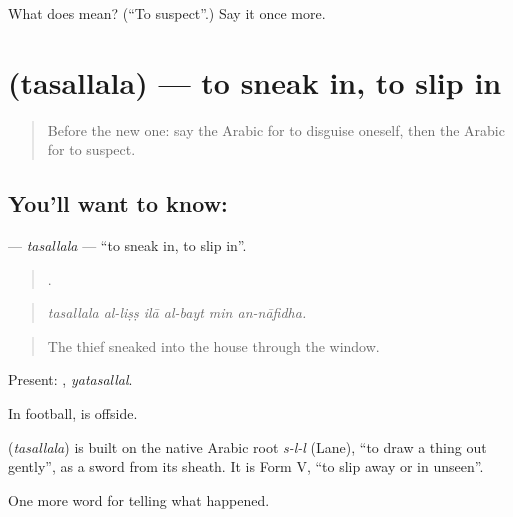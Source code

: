 \begin{tcolorbox}[breakable,colback=teal!4,colframe=teal!35!black,title={Before you move on}]
What does  mean? (\textquotedblleft{}To suspect\textquotedblright{}.) Say it once more.
\end{tcolorbox}
\section[\texorpdfstring{\ar{تسلل} (tasallala)}{تسلل (tasallala)}]{ (tasallala) — to sneak in, to slip in}

\label{lesson:AR-C346-tasallala}



\begin{quote}
Before the new one: say the Arabic for to disguise oneself, then the Arabic for to suspect.
\end{quote}

\subsection*{You'll want to know: }
\textbf{} — \emph{tasallala} — \textquotedblleft{}to sneak in, to slip in\textquotedblright{}.

\begin{quote}
     .
\end{quote}

\begin{quote}
\emph{tasallala al-liṣṣ ilā al-bayt min an-nāfidha.}
\end{quote}

\begin{quote}
The thief sneaked into the house through the window.
\end{quote}

Present: , \emph{yatasallal}.

In football,  is offside.

\begin{cousinweb}
\textbf{} (\emph{tasallala}) is built on the native Arabic root \emph{s-l-l} (Lane), \textquotedblleft{}to draw a thing out gently\textquotedblright{}, as a sword from its sheath. It is Form V, \textquotedblleft{}to slip away or in unseen\textquotedblright{}.
\end{cousinweb}

\begin{grammarlens}[title={What you've built}]
One more word for telling what happened.
\end{grammarlens}

